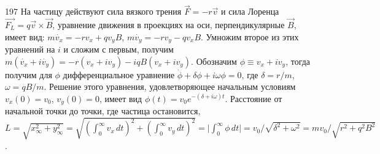 \begin{Solution}{197}
На частицу действуют сила вязкого трения $\vec{F} = - r\vec{v}$ и сила Лоренца $\vec{F_L} = q \vec{v} \times \vec{B}$, уравнение движения в проекциях на оси, перпендикулярные $\vec{B}$, имеет вид:  $m \dot{v_x}=-rv_x+q v_y B$, $m \dot{v_y}=-rv_y-q v_x B$. Умножим второе из этих уравнений на $i$ и сложим с первым, получим $m\left( \dot{v_x} +i \dot{v_y} \right) = -r(v_x+i v_y) - iqB(v_x+i v_y)$. Обозначим $\phi \equiv v_x+i v_y$, тогда получим для $\phi$ дифференциальное уравнение $\dot{\phi} + \delta \phi + i\omega \phi=0$, где $\delta=r/m$,  $\omega=qB/m$. Решение этого уравнения, удовлетворяющее начальным условиям $v_x(0)=v_0$, $v_y(0)=0$, имеет вид $\phi(t)=v_0 e^{-(\delta +i\omega) t}$. Расстояние от начальной точки до точки, где частица остановится, $L=\sqrt{x_{\infty}^2 + y_{\infty}^2} =\sqrt{ \left( \int_{0}^{\infty}{v_x \, dt} \right)^2 + \left( \int_{0}^{\infty}{v_y \, dt} \right)^2}=\vert \int_{0}^{\infty}{ \phi \, dt} \vert=v_0/\sqrt{\delta^2 +\omega^2}=m v_0/\sqrt{r^2+q^2B^2}$.
\end{Solution}
